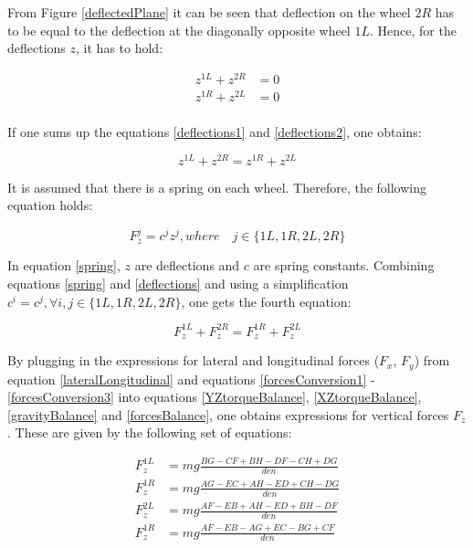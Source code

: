 \documentclass[paper=a4, fontsize=11pt]{scrartcl} %
\numberwithin{equation}{section} %
\numberwithin{figure}{section} %
\numberwithin{table}{section} %
\begin{document}
From Figure \ref{deflectedPlane} it can be seen that deflection on the wheel $2R$ has to be equal to the deflection at the diagonally opposite wheel $1L$. Hence, for the deflections $z$, it has to hold:

\begin{align}
z^{1L} + z^{2R} &= 0 \label{deflections1}\\
z^{1R} + z^{2L} &= 0 \label{deflections2}\\
\end{align}

If one sums up the equations \ref{deflections1} and \ref{deflections2}, one obtains:

\begin{equation}
z^{1L} + z^{2R} = z^{1R} + z^{2L} \label{deflections} 
\end{equation}

It is assumed that there is a spring on each wheel. Therefore, the following equation holds:

\begin{equation}
F^j_z =c^jz^j, where \quad j \in \{1L,1R,2L,2R \} \label{spring} 
\end{equation}

In equation \ref{spring}, $z$ are deflections and $c$ are spring constants. Combining equations \ref{spring} and \ref{deflections} and using a simplification $c^i = c^j, \forall i,j \in \{1L,1R,2L,2R \}$, one gets the fourth equation:

\begin{equation}
F_z^{1L} + F_z^{2R} = F_z^{1R} + F_z^{2L} \label{forcesBalance} 
\end{equation}

By plugging in the expressions for lateral and longitudinal forces ($F_x$, $F_y$) from equation \ref{lateralLongitudinal} and equations \ref{forcesConversion1} - \ref{forcesConversion3}  into equations \ref{YZtorqueBalance}, \ref{XZtorqueBalance}, \ref{gravityBalance} and \ref{forcesBalance}, one obtains expressions for vertical forces $F_z$. These are given by the following set of equations:

\begin{align}
F^{1L}_z &= mg\frac{BG - CF + BH - DF - CH + DG}{den} \\
F^{1R}_z &= mg\frac{AG - EC + AH - ED + CH - DG}{den} \\
F^{2L}_z &= mg\frac{AF - EB + AH - ED + BH - DF}{den} \\
F^{1R}_z &= mg\frac{AF - EB - AG + EC - BG + CF}{den} \\
\end{align}
\end{document}
